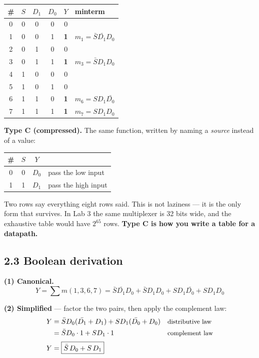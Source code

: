 \documentclass[11pt]{article}
\begin{document}
\begin{center}
\begin{tabular}{c|ccc|c|l}
\toprule
\# & $S$ & $D_1$ & $D_0$ & $Y$ & minterm \\
\midrule
0 & 0 & 0 & 0 & 0 & \\
1 & 0 & 0 & 1 & \textbf{1} & $m_1 = \bar{S}\bar{D_1}D_0$ \\
2 & 0 & 1 & 0 & 0 & \\
3 & 0 & 1 & 1 & \textbf{1} & $m_3 = \bar{S}D_1D_0$ \\
4 & 1 & 0 & 0 & 0 & \\
5 & 1 & 0 & 1 & 0 & \\
6 & 1 & 1 & 0 & \textbf{1} & $m_6 = SD_1\bar{D_0}$ \\
7 & 1 & 1 & 1 & \textbf{1} & $m_7 = SD_1D_0$ \\
\bottomrule
\end{tabular}
\end{center}

\textbf{Type C (compressed).} The same function, written by naming a \emph{source}
instead of a value:

\begin{center}
\begin{tabular}{c|c|c|l}
\toprule
\# & $S$ & $Y$ & \\
\midrule
0 & 0 & $D_0$ & pass the low input \\
1 & 1 & $D_1$ & pass the high input \\
\bottomrule
\end{tabular}
\end{center}

Two rows say everything eight rows said. This is not laziness --- it is the only
form that survives. In Lab 3 the same multiplexer is 32 bits wide, and the
exhaustive table would have $2^{65}$ rows. \textbf{Type C is how you write a table
for a datapath.}

\subsection*{2.3 Boolean derivation}

\textbf{(1) Canonical.}
\[
Y = \sum m(1,3,6,7) = \bar{S}\bar{D_1}D_0 + \bar{S}D_1D_0 + SD_1\bar{D_0} + SD_1D_0
\]

\textbf{(2) Simplified} --- factor the two pairs, then apply the complement law:
\begin{align*}
Y &= \bar{S}D_0(\bar{D_1} + D_1) + SD_1(\bar{D_0} + D_0) && \text{\small distributive law} \\
  &= \bar{S}D_0 \cdot 1 + SD_1 \cdot 1 && \text{\small complement law} \\[2pt]
Y &= \boxed{\bar{S}\,D_0 + S\,D_1}
\end{align*}
\end{document}
